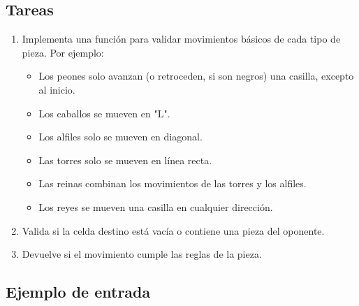 \begin{enumerate}
    \subsection*{Tareas}
    \begin{enumerate}
        \item Implementa una función para validar movimientos básicos de cada tipo de pieza. Por ejemplo:
        \begin{itemize}
            \item Los peones solo avanzan (o retroceden, si son negros) una casilla, excepto al inicio.
            \item Los caballos se mueven en "L".
            \item Los alfiles solo se mueven en diagonal.
            \item Las torres solo se mueven en línea recta.
            \item Las reinas combinan los movimientos de las torres y los alfiles.
            \item Los reyes se mueven una casilla en cualquier dirección.
        \end{itemize}
        \item Valida si la celda destino está vacía o contiene una pieza del oponente.
        \item Devuelve si el movimiento cumple las reglas de la pieza.
    \end{enumerate}

    \subsection*{Ejemplo de entrada}


\end{enumerate}

